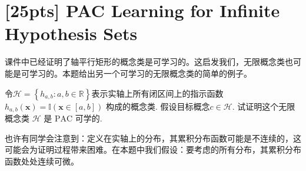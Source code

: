 \documentclass[a4paper,UTF8]{article}
\numberwithin{equation}{section}
\begin{document}
\newpage

\section{[25pts] PAC Learning for Infinite Hypothesis Sets }
课件中已经证明了轴平行矩形的概念类是可学习的。这启发我们，无限概念类也可能是可学习的。本题给出另一个可学习的无限概念类的简单的例子。

令$\mathcal{H}=\left\{h_{a, b}: a, b \in \mathbb{R}\right\}$表示实轴上所有闭区间上的指示函数 $h_{a, b}(\boldsymbol{x})=\mathbb{I}(\boldsymbol{x}\in[a, b])$ 构成的概念类. 假设目标概念$c \in \mathcal{H .}$ 试证明这个无限概念类 $\mathcal{H}$ 是 $\mathrm{PAC}$
可学的.

也许有同学会注意到：定义在实轴上的分布，其累积分布函数可能是不连续的，这可能会为证明过程带来困难。在本题中我们假设：要考虑的所有分布，其累积分布函数处处连续可微。
\end{document}
